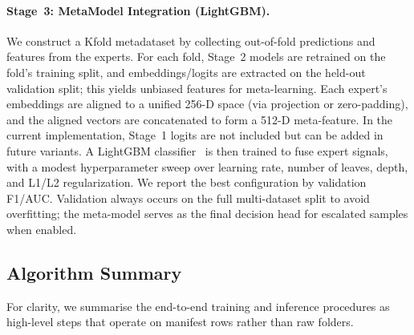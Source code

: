 \paragraph{Stage~3: Meta\-Model Integration (LightGBM).} We construct a K\-fold meta\-dataset by collecting out\hyp of\hyp fold predictions and features from the experts. For each fold, Stage~2 models are retrained on the fold's training split, and embeddings/logits are extracted on the held\hyp out validation split; this yields unbiased features for meta\hyp learning. Each expert's embeddings are aligned to a unified 256\hyp D space (via projection or zero\hyp padding), and the aligned vectors are concatenated to form a 512\hyp D meta\hyp feature. In the current implementation, Stage~1 logits are not included but can be added in future variants. A LightGBM classifier~\cite{ke2017lightgbm} is then trained to fuse expert signals, with a modest hyperparameter sweep over learning rate, number of leaves, depth, and L1/L2 regularization. We report the best configuration by validation F1/AUC. Validation always occurs on the full multi\hyp dataset split to avoid overfitting; the meta\hyp model serves as the final decision head for escalated samples when enabled.

\subsection*{Algorithm Summary}
For clarity, we summarise the end\hyp to\hyp end training and inference procedures as high\hyp level steps that operate on manifest rows rather than raw folders.

